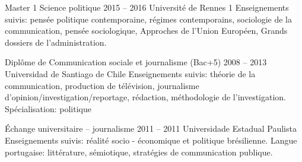 


%
%




\tbftinyfalse



\begin{coordinatelist}
\end{coordinatelist}









%
%




\begin{yearlist}

\item[Master 1 Science politique]{2015 -- 2016}
     {Université de Rennes 1}
     {Enseignements suivis: pensée politi\-que contemporaine, 
     régimes contemporains, sociologie de la communication, pensée sociologique, 
     Appro\-ches de l'Union Européen, Grands dossiers de\- l'ad\-mi\-ni\-stra\-tion.}


\item[Diplôme de Communication sociale et journalisme (Bac+5)]{2008 -- 2013}
     {Universidad de Santiago de Chile}
     {Enseignements suivis: théorie de la communication,
     production de télévision, journalisme d'opinion/investigation/reportage, 
     rédaction, méthodologie de l'investigation.
     \- Spécialisation: politique   }


\item[Échange universitaire -- journalisme]{2011 -- 2011}
     {Universidade Estadual Paulista}
     {Enseignements suivis: réalité socio - é\-co\-no\-mi\-que et politique brésilienne.
     Langue portugaise: littérature, sémiotique, stra\-té\-gies de communication publique.}


\end{yearlist}





